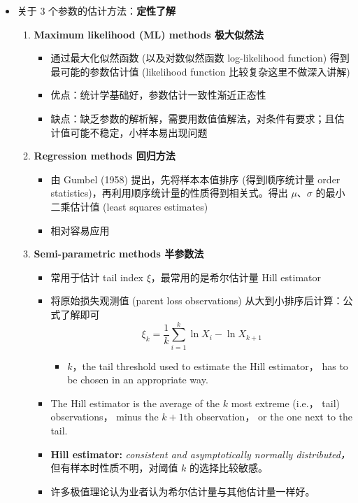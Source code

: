 \begin{itemize}

\item 关于 3 个参数的估计方法：\textbf{定性了解}

\begin{enumerate}[label=\Alph*.]
    \item \textbf{Maximum likelihood (ML) methods 极大似然法}
    \begin{itemize}
        \item 通过最大化似然函数 (以及对数似然函数 log-likelihood function) 得到最可能的参数估计值 (likelihood function 比较复杂这里不做深入讲解)
        \item 优点：统计学基础好，参数估计一致性渐近正态性
        \item 缺点：缺乏参数的解析解，需要用数值值解法，对条件有要求；且估计值可能不稳定，小样本易出现问题
    \end{itemize}

    \item \textbf{Regression methods 回归方法}
    \begin{itemize}
        \item 由 Gumbel (1958) 提出，先将样本本值排序 (得到顺序统计量 order statistics)，再利用顺序统计量的性质得到相关式。得出 $\mu$、$\sigma$ 的最小二乘估计值 (least squares estimates)
        \item 相对容易应用
    \end{itemize}

    \item \textbf{Semi-parametric methods 半参数法}
    \begin{itemize}
        \item 常用于估计 tail index $\xi$，最常用的是希尔估计量 Hill estimator
        \item 将原始损失观测值 (parent loss observations) 从大到小排序后计算：公式了解即可
        \[
        \xi_k = \frac{1}{k} \sum_{i=1}^{k} \ln X_i - \ln X_{k+1}
        \]
        \begin{itemize}
            \item $k$，the tail threshold used to estimate the Hill estimator， has to be chosen in an appropriate way.
        \end{itemize}
        \item The Hill estimator is the average of the $k$ most extreme (i.e.， tail) observations， minus the $k + 1$th observation， or the one next to the tail.
         \item \textbf{Hill estimator:} \textit{consistent and asymptotically normally distributed，} 但有样本时性质不明，对阈值 \( k \) 的选择比较敏感。
         \item 许多极值理论认为业者认为希尔估计量与其他估计量一样好。
    \end{itemize}


\end{enumerate}
\end{itemize}
